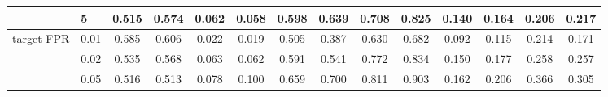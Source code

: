 \begin{table}[!t]
{\begin{tabular}{llcccccccccccc}
 & 5 & 0.515 & 0.574 & 0.062 & 0.058 & 0.598 & 0.639 & 0.708 & 0.825 & 0.140 & 0.164 & 0.206 & 0.217 \\
\midrule
target FPR & 0.01 & 0.585 & 0.606 & 0.022 & 0.019 & 0.505 & 0.387 & 0.630 & 0.682 & 0.092 & 0.115 & 0.214 & 0.171 \\
 & 0.02 & 0.535 & 0.568 & 0.063 & 0.062 & 0.591 & 0.541 & 0.772 & 0.834 & 0.150 & 0.177 & 0.258 & 0.257 \\
 & 0.05 & 0.516 & 0.513 & 0.078 & 0.100 & 0.659 & 0.700 & 0.811 & 0.903 & 0.162 & 0.206 & 0.366 & 0.305 \\
\bottomrule
\end{tabular}}
\end{table}
